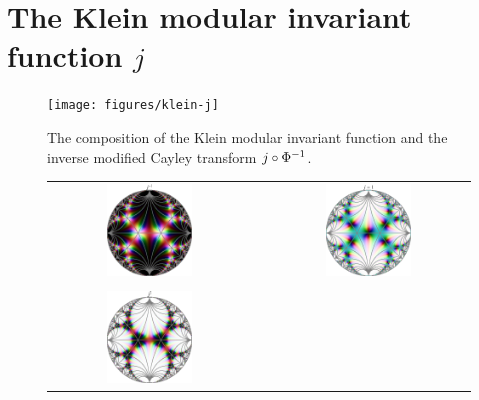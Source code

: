 \section{The Klein modular invariant function $j$}



\begin{figure}
\centering
\texttt{[image: figures/klein-j]}
\caption{The composition of the Klein modular invariant function and the inverse modified Cayley transform $j \circ {\Phi}^{-1}$.}
\label{fig_KleinJ}
\end{figure}

\begin{figure}
\centering
\begin{tabular}{c c c}
\includegraphics[width=0.45\textwidth]{figures/klein-jinv} & \quad &
\includegraphics[width=0.45\textwidth]{figures/klein-jm1} \\
\\
\includegraphics[width=0.45\textwidth]{figures/klein-jsqr} & \quad &

\end{tabular}
\end{figure}
